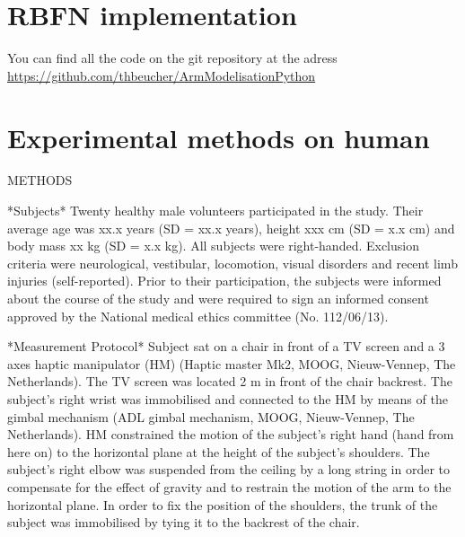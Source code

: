 \documentclass[pdftex,a4paper,12pt]{report}
\begin{document}
\pagebreak

\section{RBFN implementation}
\label{sec_rbfnCode}
You can find all the code on the git repository at the adress \url{https://github.com/thbeucher/ArmModelisationPython}


\section{Experimental methods on human}
\label{sec_humanExp}
METHODS

*Subjects*
Twenty healthy male volunteers participated in the study. Their average
age was xx.x years (SD = xx.x years), height xxx cm (SD = x.x cm) and
body mass xx kg (SD = x.x kg). All subjects were right-handed. Exclusion
criteria were neurological, vestibular, locomotion, visual disorders and
recent limb injuries (self-reported). Prior to their participation, the
subjects were informed about the course of the study and were required
to sign an informed consent approved by the National medical ethics
committee (No. 112/06/13).

*Measurement Protocol*
Subject sat on a chair in front of a TV screen and a 3 axes haptic
manipulator (HM) (Haptic master Mk2, MOOG, Nieuw-Vennep, The
Netherlands). The TV screen was located 2 m in front of the chair
backrest. The subject's right wrist was immobilised and connected to the
HM by means of the gimbal mechanism (ADL gimbal mechanism, MOOG,
Nieuw-Vennep, The Netherlands). HM constrained the motion of the
subject’s right hand (hand from here on) to the horizontal plane at
the height of the subject’s shoulders. The subject’s right elbow was
suspended from the ceiling by a long string in order to compensate for
the effect of gravity and to restrain the motion of the arm to the
horizontal plane. In order to fix the position of the shoulders, the
trunk of the subject was immobilised by tying it to the backrest of the
chair.
\end{document}
